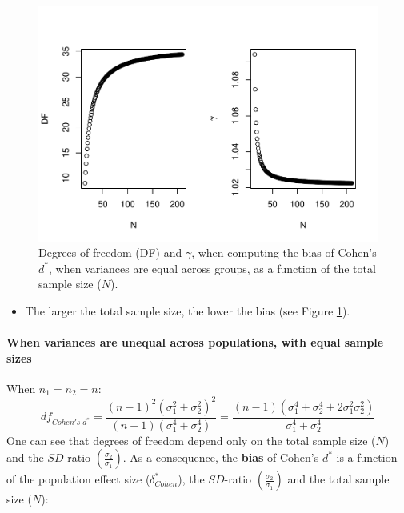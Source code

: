 \documentclass[
  english,
  man,mask]{apa6}
\providecommand{\tightlist}{%
  \setlength{\itemsep}{0pt}\setlength{\parskip}{0pt}}
\let\oldparagraph\paragraph
\renewcommand{\paragraph}[1]{\oldparagraph{#1}\mbox{}}
\begin{document}
\begin{figure}
\centering
\includegraphics{SupMat1_files/figure-latex/biascohendprimehomNsize2-1.pdf}
\caption{\label{fig:biascohendprimehomNsize2}Degrees of freedom (DF) and \(\gamma\), when computing the bias of Cohen's \(d^*\), when variances are equal across groups, as a function of the total sample size (\(N\)).}
\end{figure}

\begin{itemize}
\tightlist
\item
  The larger the total sample size, the lower the bias (see Figure \ref{fig:biascohendprimehomNsize2}).
\end{itemize}

\hypertarget{when-variances-are-unequal-across-populations-with-equal-sample-sizes}{%
\paragraph{When variances are unequal across populations, with equal sample sizes}\label{when-variances-are-unequal-across-populations-with-equal-sample-sizes}}

When \(n_1 = n_2 = n\):
\[df_{Cohen's \; d^*} = \frac{(n-1)^2(\sigma^2_1+\sigma^2_2)^2}{(n-1)(\sigma^4_1+\sigma^4_2)} =  \frac{(n-1)(\sigma^4_1+\sigma^4_2+2\sigma^2_1\sigma^2_2)}{\sigma^4_1+\sigma^4_2}\]
One can see that degrees of freedom depend only on the total sample size (\(N\)) and the \(SD\)-ratio \(\left( \frac{\sigma_2}{\sigma_1}\right)\). As a consequence, the \textbf{bias} of Cohen's \(d^*\) is a function of the population effect size (\(\delta^*_{Cohen}\)), the \(SD\)-ratio \(\left( \frac{\sigma_2}{\sigma_1}\right)\) and the total sample size (\(N\)):
\end{document}
